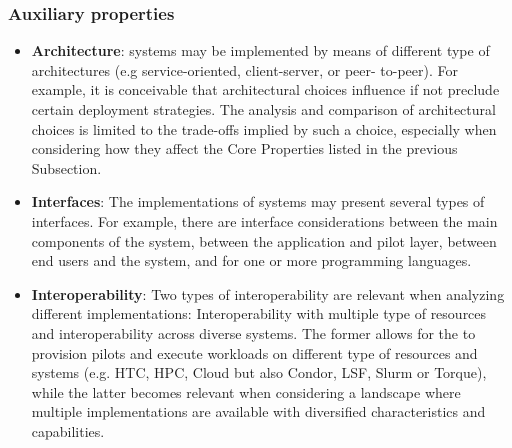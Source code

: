 \documentclass{sig-alternate}
\begin{document}
\subsubsection{Auxiliary properties}

\begin{itemize}

\item \textbf{Architecture}: \pilotjob systems may be implemented by
  means of different type of architectures (e.g service-oriented,
  client-server, or peer- to-peer). For example, it is conceivable
  that architectural choices influence if not preclude certain
  deployment strategies. The analysis and comparison of architectural
  choices is limited to the trade-offs implied by such a choice,
  especially when considering how they affect the Core Properties
  listed in the previous Subsection.



\item \textbf{Interfaces}: The implementations of \pilotjob systems
  may present several types of interfaces. For example, there are
  interface considerations between the main components of the
  \pilotjob system, between the application and pilot layer, between
  end users and the \pilotjob system, and for one or more programming
  languages.

\item \textbf{Interoperability}: Two types of interoperability are
  relevant when analyzing different \pilotjob implementations:
  Interoperability with multiple type of resources and
  interoperability across diverse \pilotjob systems. The former allows
  for the \pilotjob to provision pilots and execute workloads on
  different type of resources and systems (e.g. HTC, HPC, Cloud but
  also Condor, LSF, Slurm or Torque), while the latter becomes
  relevant when considering a landscape where multiple \pilotjob
  implementations are available with diversified characteristics and
  capabilities.


\end{itemize}
\end{document}
